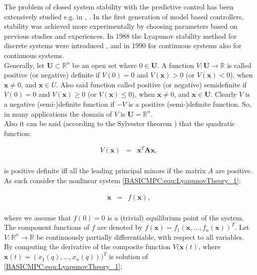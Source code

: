 	The problem of closed system stability with the predictive control has been extensively studied e.g. in \cite{mayne2000constrained}, \cite{grieder2005stabilizing}. In the first generation of model based controllers, stability was achieved more experimentally by choosing parameters based on previous studies and experiences. In 1988 the Lyapunov stability method for discrete systems were introduced \cite{keerthi1988optimal}, and in 1990 for continuous systems \cite{mayne1990receding} also for continuous systems. \\
	Generally, let $\textbf{U}\subset\mathbb{R}^n$ be an open set where $0\in \textbf{U}$. A function $V:\textbf{U}\longrightarrow\mathbb{R}$ is called positive (or negative) definite if $V(0)=0$ and $V(\boldsymbol{x})>0$ (or $V(\boldsymbol{x})<0$), when $\boldsymbol{x}\neq0$, and $\boldsymbol{x}\in U$. Also said function called positive (or negative) semidefinite if $V(0)=0$ and $V(\boldsymbol{x})\geq 0$ (or $V(\boldsymbol{x})\leq 0$), when $\boldsymbol{x}\neq 0$, and $\boldsymbol{x}\in \textbf{U}$. Clearly $V$ is a negative (semi-)definite function if $-V$ is a positive (semi-)definite function. So, in many applications the domain of $V$ is $\textbf{U}=\mathbb{R}^n$.\\
	Also it can be said (according to the Sylvester theorem \cite{horn2012matrix}) that the quadratic function:
	
	\begin{equation}
        \begin{array}{rcl}
				V(\boldsymbol{x})&=&\boldsymbol{x}^T\boldsymbol{A}\boldsymbol{x},\\
        \end{array}
        \label{BASICMPC:equ:LyapunovTheory_0}
    \end{equation}
	
	is positive definite iff all the leading principal minors if the matrix $A$ are positive. As such consider the nonlinear system \ref{BASICMPC:equ:LyapunovTheory_1}:
	
	\begin{equation}
        \begin{array}{rcl}
				\boldsymbol{\dot{x}}&=&f(\boldsymbol{x}),\\
        \end{array}
        \label{BASICMPC:equ:LyapunovTheory_1}
    \end{equation}
	
	where we assume that $f(0)=0$ is a (trivial) equilibrium point of the system. The component functions of $f$ are denoted by $f(\boldsymbol{x})=f_1(\boldsymbol{x},\dots,f_n(\boldsymbol{x}))^T$. Let $V:\mathbb{R}^n\longrightarrow\mathbb{R}$ be continuously partially differentiable, with respect to all variables. By computing the derivative of the composite function $V(\boldsymbol{x}(t)$, where $\boldsymbol{x}(t)=(x_1(q),\dots,x_n(q)))^T$ is solution of \ref{BASICMPC:equ:LyapunovTheory_1}:
	
